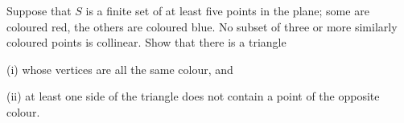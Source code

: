 Suppose that $S$ is a finite set of at least five points in the plane; some are coloured red, the others are coloured blue.  No subset of three or more similarly coloured points is collinear.  Show that there is a triangle

(i) whose vertices are all the same colour, and

(ii) at least one side of the triangle does not contain a point of the opposite colour.